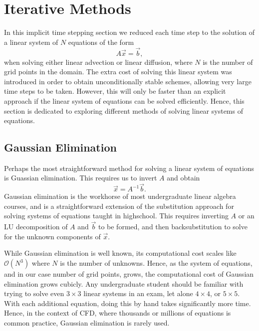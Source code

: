 \chapter{Iterative Methods}
In this implicit time stepping section we reduced each time step to the solution of a linear system of $N$ equations of the form 
\begin{equation}
	A \vec{x} = \vec{b},
\end{equation}
when solving either linear advection or linear diffusion, where $N$ is the number of grid points in the domain. The extra cost of solving this linear system was introduced in order to obtain unconditionally stable schemes, allowing very large time steps to be taken. However, this will only be faster than an explicit approach if the linear system of equations can be solved efficiently. Hence, this section is dedicated to exploring different methods of solving linear systems of equations.

\section{Gaussian Elimination}
Perhaps the most straightforward method for solving a linear system of equations is Guassian elimination. This requires us to invert $A$ and obtain
\begin{equation}
	 \vec{x} = A^{-1} \vec{b}.
\end{equation}
Gaussian elimination is the workhorse of most undergraduate linear algebra courses, and is a straightforward extension of the substitution approach for solving systems of equations taught in highschool. This requires inverting $A$ or an LU decomposition of $A$ and $\vec{b}$ to be formed, and then backsubstitution to solve for the unknown components of $\vec{x}$.

While Gaussian elimination is well known, its computational cost scales like $\mathcal{O}(N^3)$ where $N$ is the number of unknowns. Hence, as the system of equations, and in our case number of grid points, grows, the computational cost of Gaussian elimination grows cubicly. Any undergraduate student should be familiar with trying to solve even $3 \times 3$ linear systems in an exam, let alone $4 \times 4$, or $5 \times 5$. With each additional equation, doing this by hand takes significantly more time. Hence, in the context of CFD, where thousands or millions of equations is common practice, Gaussian elimination is rarely used.

